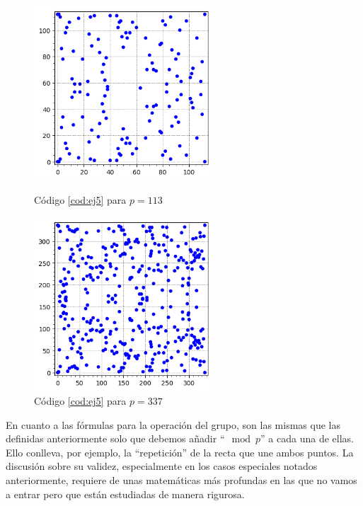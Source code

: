 \documentclass[11pt]{article}
\begin{document}
\begin{figure}[H]
	\centering
	\begin{minipage}[b]{0.4\textwidth}
	\centering
	\includegraphics[width=0.6\textwidth]{EC_F_113}
	\caption{Código \ref{cod:ej5} para $ p = 113 $}
	\label{fig:ej5}
	\end{minipage}
	\begin{minipage}[b]{0.4\textwidth}
		\centering
	\includegraphics[width=0.6\textwidth]{EC_F_337}
	\caption{Código \ref{cod:ej5} para $ p = 337 $}
	\label{fig:ej6}
	\end{minipage}
\end{figure}

En cuanto a las fórmulas para la operación del grupo, son las mismas que las definidas anteriormente solo que debemos añadir ``$ \mod p $'' a cada una de ellas. Ello conlleva, por ejemplo, la ``repetición'' de la recta que une ambos puntos. La discusión sobre su validez, especialmente en los casos especiales notados anteriormente, requiere de unas matemáticas más profundas en las que no vamos a entrar pero que están estudiadas de manera rigurosa.
\end{document}
